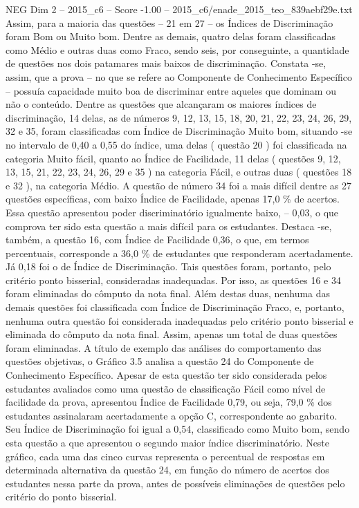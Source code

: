 \begin{textsample}{NEG Dim 2 – 2015\_c6 – Score -1.00 – 2015\_c6/enade\_2015\_teo\_839aebf29e.txt}
Assim, para a maioria das questões – 21 em 27 – os Índices de Discriminação foram Bom ou Muito bom.
Dentre as demais, quatro delas foram classificadas como Médio e outras duas como Fraco, sendo seis, por conseguinte, a quantidade de questões nos dois patamares mais baixos de discriminação.
Constata -se, assim, que a prova – no que se refere ao Componente de Conhecimento Específico – possuía capacidade muito boa de discriminar entre aqueles que dominam ou não o conteúdo.
Dentre as questões que alcançaram os maiores índices de discriminação, 14 delas, as de números 9, 12, 13, 15, 18, 20, 21, 22, 23, 24, 26, 29, 32 e 35, foram classificadas com Índice de Discriminação Muito bom, situando -se no intervalo de 0,40 a 0,55 do índice, uma delas ( questão 20 ) foi classificada na categoria Muito fácil, quanto ao Índice de Facilidade, 11 delas ( questões 9, 12, 13, 15, 21, 22, 23, 24, 26, 29 e 35 ) na categoria Fácil, e outras duas ( questões 18 e 32 ), na categoria Médio.
A questão de número 34 foi a mais difícil dentre as 27 questões específicas, com baixo Índice de Facilidade, apenas 17,0 \% de acertos.
Essa questão apresentou poder discriminatório igualmente baixo, – 0,03, o que comprova ter sido esta questão a mais difícil para os estudantes.
Destaca -se, também, a questão 16, com Índice de Facilidade 0,36, o que, em termos percentuais, corresponde a 36,0 \% de estudantes que responderam acertadamente.
Já 0,18 foi o de Índice de Discriminação.
Tais questões foram, portanto, pelo critério ponto bisserial, consideradas inadequadas.
Por isso, as questões 16 e 34 foram eliminadas do cômputo da nota final.
Além destas duas, nenhuma das demais questões foi classificada com Índice de Discriminação Fraco, e, portanto, nenhuma outra questão foi considerada inadequadas pelo critério ponto bisserial e eliminada do cômputo da nota final.
Assim, apenas um total de duas questões foram eliminadas.
A título de exemplo das análises do comportamento das questões objetivas, o Gráfico 3.5 analisa a questão 24 do Componente de Conhecimento Específico.
Apesar de esta questão ter sido considerada pelos estudantes avaliados como uma questão de classificação Fácil como nível de facilidade da prova, apresentou Índice de Facilidade 0,79, ou seja, 79,0 \% dos estudantes assinalaram acertadamente a opção C, correspondente ao gabarito.
Seu Índice de Discriminação foi igual a 0,54, classificado como Muito bom, sendo esta questão a que apresentou o segundo maior índice discriminatório.
Neste gráfico, cada uma das cinco curvas representa o percentual de respostas em determinada alternativa da questão 24, em função do número de acertos dos estudantes nessa parte da prova, antes de possíveis eliminações de questões pelo critério do ponto bisserial.

\end{textsample}
